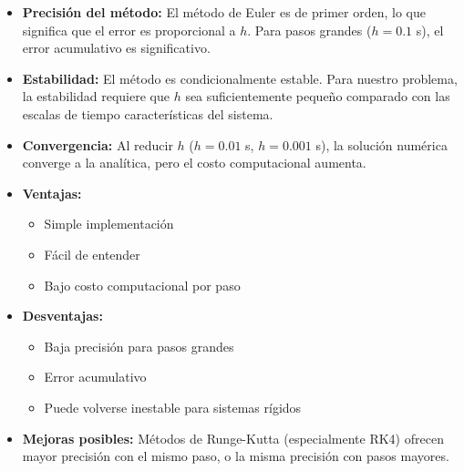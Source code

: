 \documentclass[12pt,a4paper]{article}
\begin{document}
\begin{itemize}
    \item \textbf{Precisión del método:} El método de Euler es de primer orden, lo que significa que el error es proporcional a $h$. Para pasos grandes ($h=0.1$ s), el error acumulativo es significativo.
    
    \item \textbf{Estabilidad:} El método es condicionalmente estable. Para nuestro problema, la estabilidad requiere que $h$ sea suficientemente pequeño comparado con las escalas de tiempo características del sistema.
    
    \item \textbf{Convergencia:} Al reducir $h$ ($h=0.01$ s, $h=0.001$ s), la solución numérica converge a la analítica, pero el costo computacional aumenta.
    
    \item \textbf{Ventajas:}
    \begin{itemize}
        \item Simple implementación
        \item Fácil de entender
        \item Bajo costo computacional por paso
    \end{itemize}
    
    \item \textbf{Desventajas:}
    \begin{itemize}
        \item Baja precisión para pasos grandes
        \item Error acumulativo
        \item Puede volverse inestable para sistemas rígidos
    \end{itemize}
    
    \item \textbf{Mejoras posibles:} Métodos de Runge-Kutta (especialmente RK4) ofrecen mayor precisión con el mismo paso, o la misma precisión con pasos mayores.
\end{itemize}
\end{document}
